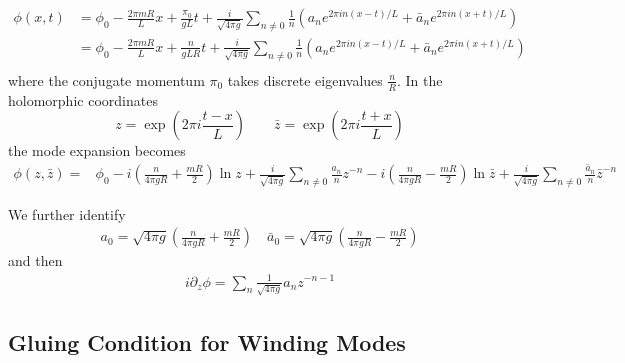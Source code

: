 \begin{widetext}
\begin{equation}
\begin{aligned}
\phi( x, t ) &= \phi_0 - \frac{2\pi m R}{L}x + \frac{\pi_0}{gL} t  + \frac{i}{\sqrt{4 \pi g}}\sum_{n\neq0}\frac{1}{n}(a_ne^{2\pi i n(x-t)/L}+ \bar{a}_{n} e^{2\pi i n(x+t)/L})\\  
&= \phi_0 - \frac{2\pi m R}{L}x + \frac{n}{gLR} t  +  \frac{i}{\sqrt{4 \pi g}}\sum_{n\neq0}\frac{1}{n}(a_ne^{2\pi i n(x-t)/L}+ \bar{a}_{n} e^{2\pi i n(x+t)/L})\\ 
\end{aligned}
\end{equation}
where the conjugate momentum $\pi_0$ takes discrete eigenvalues $\frac{n}{R}$. In the holomorphic coordinates
\begin{equation}
z = \exp( 2 \pi i \frac{t - x}{L}) \qquad \bar{z} = \exp( 2 \pi i \frac{t + x}{L})
\end{equation}
the mode expansion becomes
\begin{equation}
\label{eq:boson-mode-exp}
\begin{aligned}
\phi( z, \bar{z}) = &\phi_0 -i \left( \frac{n}{4\pi g  R} + \frac{m R }{2} \right)  \ln z + \frac{i}{\sqrt{4\pi g}} \sum_{n\ne 0 } \frac{a_n}{n} z^{-n } -i \left( \frac{n}{4\pi g R} - \frac{m R }{2} \right)  \ln \bar{z} + \frac{i}{\sqrt{4\pi g}} \sum_{n\ne 0 } \frac{\bar{a}_n}{n} \bar{z}^{-n } 
\end{aligned}
\end{equation}
\end{widetext}
We further identify 
\begin{equation}
\begin{aligned}
  a_0 = \sqrt{ 4 \pi g } \left( \frac{n}{4\pi g R} + \frac{m R }{2} \right) \quad \bar{a}_0 = \sqrt{ 4 \pi g } \left( \frac{n}{4\pi g R} - \frac{m R }{2} \right)
  \end{aligned}
\end{equation}
and then 
\begin{equation}
\begin{aligned}
i \partial_z \phi =  \sum_n \frac{1}{\sqrt{4\pi g}} a_n z^{-n-1} 
\end{aligned}
\end{equation}

\subsection{Gluing Condition for Winding Modes}
\label{app_sub:compact_gluing_boundary}

